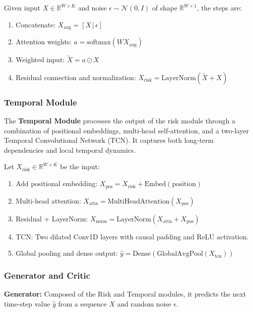 Given input $X \in \mathbb{R}^{W \times K}$ and noise $\epsilon \sim \mathcal{N}(0, I)$ of shape $\mathbb{R}^{W \times 1}$, the steps are:
\begin{enumerate}
    \item Concatenate: $X_{\text{aug}} = [X \, | \, \epsilon]$
    \item Attention weights: $a = \text{softmax}(WX_{\text{aug}})$
    \item Weighted input: $\tilde{X} = a \odot X$
    \item Residual connection and normalization: $X_{\text{risk}} = \text{LayerNorm}(\tilde{X} + X)$
\end{enumerate}

\subsubsection{Temporal Module}

The \textbf{Temporal Module} processes the output of the risk module through a combination of positional embeddings, multi-head self-attention, and a two-layer Temporal Convolutional Network (TCN). It captures both long-term dependencies and local temporal dynamics.

Let $X_{\text{risk}} \in \mathbb{R}^{W \times K}$ be the input:
\begin{enumerate}
    \item Add positional embedding: $X_{\text{pos}} = X_{\text{risk}} + \text{Embed}(\text{position})$
    \item Multi-head attention: $X_{\text{attn}} = \text{MultiHeadAttention}(X_{\text{pos}})$
    \item Residual + LayerNorm: $X_{\text{norm}} = \text{LayerNorm}(X_{\text{attn}} + X_{\text{pos}})$
    \item TCN: Two dilated Conv1D layers with causal padding and ReLU activation.
    \item Global pooling and dense output: $\hat{y} = \text{Dense}( \text{GlobalAvgPool}(X_{\text{tcn}}) )$
\end{enumerate}

\subsubsection{Generator and Critic}

\textbf{Generator:} Composed of the Risk and Temporal modules, it predicts the next time-step value $\hat{y}$ from a sequence $X$ and random noise $\epsilon$.

